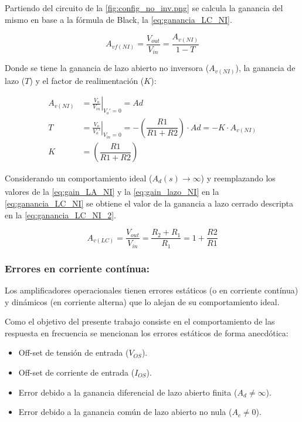 Partiendo del circuito de la \autoref{fig:config_no_inv.png} se calcula la ganancia del mismo en base a la fórmula de Black, la \autoref{eq:ganancia_LC_NI}.

\begin{equation}
    A_{vf(NI)} = \frac{V_{out}}{V_{in}} = \dfrac{A_{v(NI)}}{1 - T} 
    \label{eq:ganancia_LC_NI}
\end{equation}

Donde se tiene la ganancia de lazo abierto no inversora ($A_{v(NI)}$), la ganancia de lazo ($T$) y el factor de realimentación ($K$):

\begin{align}
    A_{v(NI)} &= \left.\frac{V_o}{V_{in}}\right|_{V_o'=0} = Ad
    \label{eq:gain_LA_NI}\\
    T &= \left.\frac{V_o}{V_{o}'}\right|_{V_{in}=0} = -(\dfrac{R1}{R1+R2})\cdot Ad = - K \cdot A_{v(NI)}
    \label{eq:gain_lazo_NI}\\
    K &= (\dfrac{R1}{R1+R2})
    \label{eq:K_NI}
\end{align}

Considerando un comportamiento ideal ($ A_{d}(s) \xrightarrow[]{}{\infty}$) y reemplazando los valores de la \autoref{eq:gain_LA_NI} y la \autoref{eq:gain_lazo_NI} en la \autoref{eq:ganancia_LC_NI}  se obtiene el valor de la ganancia a lazo cerrado descripta en la \autoref{eq:ganancia_LC_NI_2}.

\begin{equation}
    A_{v(LC)} = \frac{V_{out}}{V_{in}} = \dfrac{R_2 + R_1}{R_1} = 1 + \dfrac{R2}{R1} 
    \label{eq:ganancia_LC_NI_2}
\end{equation}

\subsubsection{Errores en corriente contínua:}
 Los amplificadores operacionales tienen errores estáticos (o en corriente contínua) y dinámicos (en corriente alterna) que lo alejan de su comportamiento ideal.

 Como el objetivo del presente trabajo consiste en el comportamiento de las respuesta en frecuencia se mencionan los errores estáticos de forma anecdótica:
\begin{itemize}
    \item Off-set de tensión de entrada ($V_{OS}$).
    \item Off-set de corriente de entrada ($I_{OS}$).
    \item Error debido a la ganancia diferencial de lazo abierto finita ($A_d \neq \infty $).
    \item Error debido a la ganancia común de lazo abierto no nula ($A_c \neq 0$).
\end{itemize}
 
